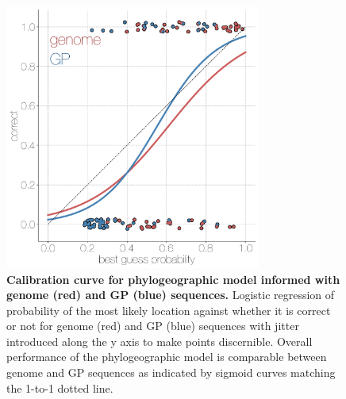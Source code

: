 \documentclass[11pt,oneside,letterpaper]{article}
\begin{document}
\begin{figure}[h]
 \centering
	\includegraphics[width=0.75\textwidth]{supp_figures/sfig6_calibration.png}
	\caption{\textbf{Calibration curve for phylogeographic model informed with genome (red) and GP (blue) sequences.}
  Logistic regression of probability of the most likely location against whether it is correct or not for genome (red) and GP (blue) sequences with jitter introduced along the y axis to make points discernible.
  Overall performance of the phylogeographic model is comparable between genome and GP sequences as indicated by sigmoid curves matching the 1-to-1 dotted line.
	}
	\label{calibration}
\end{figure}
\end{document}

